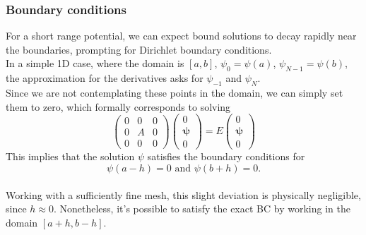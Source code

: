 
\subsubsection{Boundary conditions}
For a short range potential, we can expect bound solutions to decay rapidly near the boundaries, prompting for Dirichlet boundary conditions.
\\In a simple 1D case, where the domain is $[a, b]$, $\psi_0 = \psi(a)$, $\psi_{N-1} = \psi(b)$, the approximation for the derivatives asks for $\psi_{-1}$ and $\psi_N$.
\\Since we are not contemplating these points in the domain, we can simply set them to zero, which formally corresponds to solving
\begin{equation}
    \begin{pmatrix}
        0 & 0 & 0 
        \\0 & A & 0
        \\0 & 0 & 0
    \end{pmatrix}
    \begin{pmatrix}
        0\\\mathbf{\psi}\\0
    \end{pmatrix}
    = E 
    \begin{pmatrix}
        0\\\mathbf{\psi}\\0
    \end{pmatrix}
\end{equation}
This implies that the solution $\psi$ satisfies the boundary conditions for 
\begin{equation}
    \psi(a-h)=0 \text{ and } \psi(b+h)=0.
\end{equation}
\\Working with a sufficiently fine mesh, this slight deviation is physically negligible, since $h \approx 0$. Nonetheless, it's possible to satisfy the exact BC by working in the domain $[a+h, b-h]$. 
